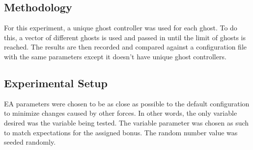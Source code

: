 \documentclass{article}
\begin{document}
\subsection{Methodology}
\begin{flushleft}
For this experiment, a unique ghost controller was used for each ghost. To do
this, a vector of different ghosts is used and passed in until the limit of
ghosts is reached. The results are then recorded and compared against a
configuration file with the same parameters except it doesn't have unique ghost
controllers.
\end{flushleft}

\subsection{Experimental Setup}
\begin{flushleft}
EA parameters were chosen to be as close as possible to the default
configuration to minimize changes caused by other forces. In other words, the
only variable desired was the variable being tested. The variable parameter was
chosen as such to match expectations for the assigned bonus. The random number
value was seeded randomly.
\end{flushleft}

\clearpage
\end{document}
